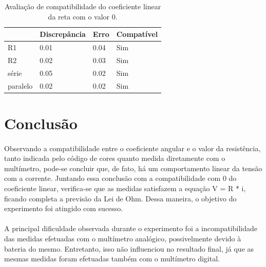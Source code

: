 \documentclass[11pt,a4paper]{article}
\begin{document}
      
      \begin{table}[htb!]
        \centering
        \begin{tabular}{llll}
        \toprule
                   & Discrepância      & Erro & Compatível                          \\
          \midrule
          R1       & 0.01              & 0.04 & {\color[HTML]{009901} Sim}          \\
          R2       & 0.02              & 0.03 & {\color[HTML]{009901} Sim}          \\
          série    & 0.05              & 0.02 & {\color[HTML]{009901} Sim}          \\
          paralelo & 0.02              & 0.02 & {\color[HTML]{009901} Sim}          \\ 
          \bottomrule
        \end{tabular}
        \caption{Avaliação de compatibilidade do coeficiente linear da reta com o valor 0.}
        \label{tab:compatb}
      \end{table}

  \section{Conclusão}
      
     \paragraph{}
    Observando a compatibilidade entre o coeficiente angular e o valor da resistência, tanto indicada pelo código de cores quanto medida diretamente com o multímetro, pode-se concluir que, de fato, há um comportamento linear da tensão com a corrente. Juntando essa conclusão com a compatibilidade com 0 do coeficiente linear, verifica-se que as medidas satisfazem a equação V = R * i, ficando completa a previsão da Lei de Ohm. Dessa maneira, o objetivo do experimento foi atingido com sucesso.
    \paragraph{}
     A principal dificuldade observada durante o experimento foi a incompatibilidade das medidas efetuadas com o multímetro analógico, possivelmente devido à bateria do mesmo. Entretanto, isso não influenciou no resultado final, já que as mesmas medidas foram efetuadas também com o multímetro digital.      
\end{document}
